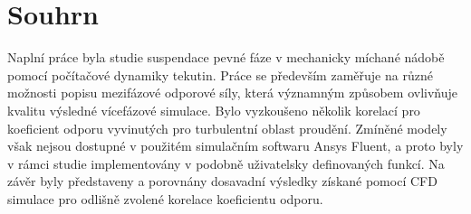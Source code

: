 \section*{Souhrn}
\vspace{3mm}
Naplní práce byla studie suspendace pevné fáze v mechanicky míchané nádobě pomocí počítačové dynamiky tekutin. Práce se především zaměřuje na různé možnosti popisu mezifázové odporové síly, která významným způsobem ovlivňuje kvalitu výsledné vícefázové simulace. Bylo vyzkoušeno několik korelací pro koeficient odporu vyvinutých pro turbulentní oblast proudění. Zmíněné modely však nejsou dostupné v použitém simulačním softwaru Ansys Fluent, a proto byly v rámci studie implementovány v podobně uživatelsky definovaných funkcí. Na závěr byly představeny a porovnány dosavadní výsledky získané pomocí CFD simulace pro odlišně zvolené korelace koeficientu odporu.
